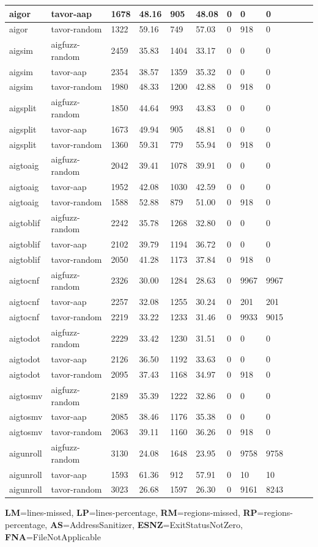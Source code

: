 \begin{table}
\begin{small}
\begin{center}
\begin{threeparttable}
\begin{tabular}{| l | l | l | l | l | l | l | l | l | l | l | l |}
\hline aigor & tavor-aap & 1678 & 48.16 & 905 & 48.08 & 0 & 0 & 0 \tabularnewline
\hline aigor & tavor-random & 1322 & 59.16 & 749 & 57.03 & 0 & 918 & 0 \tabularnewline
\hline aigsim & aigfuzz-random & 2459 & 35.83 & 1404 & 33.17 & 0 & 0 & 0 \tabularnewline
\hline aigsim & tavor-aap & 2354 & 38.57 & 1359 & 35.32 & 0 & 0 & 0 \tabularnewline
\hline aigsim & tavor-random & 1980 & 48.33 & 1200 & 42.88 & 0 & 918 & 0 \tabularnewline
\hline aigsplit & aigfuzz-random & 1850 & 44.64 & 993 & 43.83 & 0 & 0 & 0 \tabularnewline
\hline aigsplit & tavor-aap & 1673 & 49.94 & 905 & 48.81 & 0 & 0 & 0 \tabularnewline
\hline aigsplit & tavor-random & 1360 & 59.31 & 779 & 55.94 & 0 & 918 & 0 \tabularnewline
\hline aigtoaig & aigfuzz-random & 2042 & 39.41 & 1078 & 39.91 & 0 & 0 & 0 \tabularnewline
\hline aigtoaig & tavor-aap & 1952 & 42.08 & 1030 & 42.59 & 0 & 0 & 0 \tabularnewline
\hline aigtoaig & tavor-random & 1588 & 52.88 & 879 & 51.00 & 0 & 918 & 0 \tabularnewline
\hline aigtoblif & aigfuzz-random & 2242 & 35.78 & 1268 & 32.80 & 0 & 0 & 0 \tabularnewline
\hline aigtoblif & tavor-aap & 2102 & 39.79 & 1194 & 36.72 & 0 & 0 & 0 \tabularnewline
\hline aigtoblif & tavor-random & 2050 & 41.28 & 1173 & 37.84 & 0 & 918 & 0 \tabularnewline
\hline aigtocnf & aigfuzz-random & 2326 & 30.00 & 1284 & 28.63 & 0 & 9967 & 9967 \tabularnewline
\hline aigtocnf & tavor-aap & 2257 & 32.08 & 1255 & 30.24 & 0 & 201 & 201 \tabularnewline
\hline aigtocnf & tavor-random & 2219 & 33.22 & 1233 & 31.46 & 0 & 9933 & 9015 \tabularnewline
\hline aigtodot & aigfuzz-random & 2229 & 33.42 & 1230 & 31.51 & 0 & 0 & 0 \tabularnewline
\hline aigtodot & tavor-aap & 2126 & 36.50 & 1192 & 33.63 & 0 & 0 & 0 \tabularnewline
\hline aigtodot & tavor-random & 2095 & 37.43 & 1168 & 34.97 & 0 & 918 & 0 \tabularnewline
\hline aigtosmv & aigfuzz-random & 2189 & 35.39 & 1222 & 32.86 & 0 & 0 & 0 \tabularnewline
\hline aigtosmv & tavor-aap & 2085 & 38.46 & 1176 & 35.38 & 0 & 0 & 0 \tabularnewline
\hline aigtosmv & tavor-random & 2063 & 39.11 & 1160 & 36.26 & 0 & 918 & 0 \tabularnewline
\hline aigunroll & aigfuzz-random & 3130 & 24.08 & 1648 & 23.95 & 0 & 9758 & 9758 \tabularnewline
\hline aigunroll & tavor-aap & 1593 & 61.36 & 912 & 57.91 & 0 & 10 & 10 \tabularnewline
\hline aigunroll & tavor-random & 3023 & 26.68 & 1597 & 26.30 & 0 & 9161 & 8243 \tabularnewline
\hline
\end{tabular}
\begin{tablenotes}
\textbf{LM}=lines-missed, \textbf{LP}=lines-percentage, \textbf{RM}=regions-missed, \textbf{RP}=regions-percentage, \textbf{AS}=AddressSanitizer, \textbf{ESNZ}=ExitStatusNotZero, \textbf{FNA}=FileNotApplicable
\end{tablenotes}
\end{threeparttable}
\end{center}
\end{small}
\end{table}


